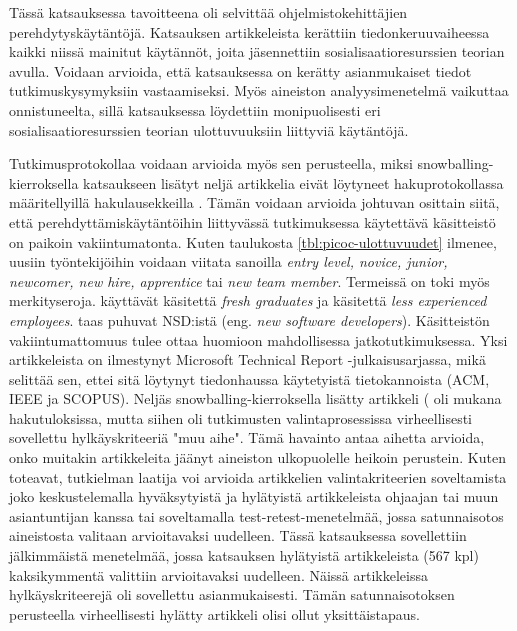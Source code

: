 \documentclass[utf8]{gradu3}
\begin{document}
Tässä katsauksessa tavoitteena oli selvittää ohjelmistokehittäjien perehdytyskäytäntöjä. Katsauksen artikkeleista kerättiin tiedonkeruuvaiheessa kaikki niissä mainitut käytännöt, joita jäsennettiin sosialisaatioresurssien teorian avulla. Voidaan arvioida, että katsauksessa on kerätty asianmukaiset tiedot tutkimuskysymyksiin vastaamiseksi. Myös aineiston analyysimenetelmä vaikuttaa onnistuneelta, sillä katsauksessa löydettiin monipuolisesti eri sosialisaatioresurssien teorian ulottuvuuksiin liittyviä käytäntöjä.

Tutkimusprotokollaa voidaan arvioida myös sen perusteella, miksi snowballing-kierroksella katsaukseen lisätyt neljä artikkelia eivät löytyneet hakuprotokollassa määritellyillä hakulausekkeilla %
\parencites%
    {bjornson-dingsøyr-2005}%
    {kulkarni-ym-2010}%
    {hemphill-begel-2011}%
    {viviani-murphy-2019}%
\relax.
%
Tämän voidaan arvioida johtuvan osittain siitä, että perehdyttämiskäytäntöihin liittyvässä tutkimuksessa käytettävä käsitteistö on paikoin vakiintumatonta. Kuten taulukosta \ref{tbl:picoc-ulottuvuudet} ilmenee, uusiin työntekijöihin voidaan viitata sanoilla \textit{entry level, novice, junior, newcomer, new hire, apprentice} tai \textit{new team member}. Termeissä on toki myös merkityseroja. \textcite{kulkarni-ym-2010} käyttävät käsitettä \textit{fresh graduates} ja \textcite{bjornson-dingsøyr-2005} käsitettä \textit{less experienced employees}. \textcite{begel-simon-2008} taas puhuvat NSD:istä (eng. \textit{new software developers}). Käsitteistön vakiintumattomuus tulee ottaa huomioon mahdollisessa jatkotutkimuksessa. Yksi artikkeleista \parencite{hemphill-begel-2011} on ilmestynyt Microsoft Technical Report -julkaisusarjassa, mikä selittää sen, ettei sitä löytynyt tiedonhaussa käytetyistä tietokannoista (ACM, IEEE ja SCOPUS). Neljäs snowballing-kierroksella lisätty artikkeli (\textcite{viviani-murphy-2019} oli mukana hakutuloksissa, mutta siihen oli tutkimusten valintaprosessissa virheellisesti sovellettu hylkäyskriteeriä "muu aihe". Tämä havainto antaa aihetta arvioida, onko muitakin artikkeleita jäänyt aineiston ulkopuolelle heikoin perustein. Kuten \textcite{kitchenham-charters-2007} toteavat, tutkielman laatija voi arvioida artikkelien valintakriteerien soveltamista joko keskustelemalla hyväksytyistä ja hylätyistä artikkeleista ohjaajan tai muun asiantuntijan kanssa tai soveltamalla test-retest-menetelmää, jossa satunnaisotos aineistosta valitaan arvioitavaksi uudelleen. Tässä katsauksessa sovellettiin jälkimmäistä menetelmää, jossa katsauksen hylätyistä artikkeleista (567 kpl) kaksikymmentä valittiin arvioitavaksi uudelleen. Näissä artikkeleissa hylkäyskriteerejä oli sovellettu asianmukaisesti. Tämän satunnaisotoksen perusteella virheellisesti hylätty artikkeli \parencite{viviani-murphy-2019} olisi ollut yksittäistapaus. 
\end{document}
